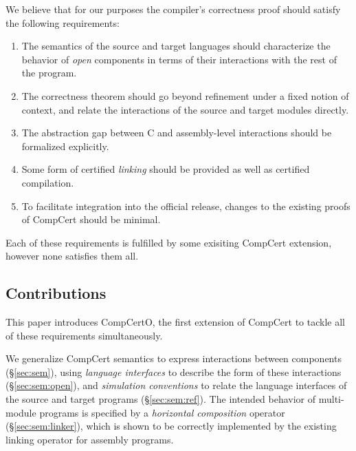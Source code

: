 \documentclass[acmsmall,authordraft]{acmart}
\begin{document}
We believe that for our purposes
the compiler's correctness proof
should satisfy the following requirements:
\begin{enumerate}
\item \label{req:opensem}
  The semantics of the source and target languages
  should characterize the behavior of \emph{open} components
  in terms of their interactions with the rest of the program.
\item \label{req:opensim}
  The correctness theorem
  should go beyond refinement under a fixed notion of context, and relate
  the interactions of the source and target modules directly.
\item \label{req:openabs}
  The abstraction gap between C and assembly-level
  interactions should be formalized explicitly.
\item \label{req:linking}
  Some form of certified \emph{linking}
  should be provided as well as certified compilation.
\item \label{req:complexity}
  To facilitate integration into the official release,
  changes to the existing proofs of CompCert
  should be minimal.
\end{enumerate}
Each of these requirements is fulfilled
by some exisiting CompCert extension,
however none satisfies them all.



\subsection{Contributions} %

This paper introduces CompCertO,
the first extension of CompCert to tackle
all of these requirements simultaneously.

We generalize CompCert semantics
to express interactions between components (\S\ref{sec:sem}),
using \emph{language interfaces}
to describe the form of these interactions (\S\ref{sec:sem:open}),
and \emph{simulation conventions}
to relate the language interfaces
of the source and target programs (\S\ref{sec:sem:ref}).
The intended behavior of
multi-module programs is specified by a
\emph{horizontal composition} operator (\S\ref{sec:sem:linker}),
which is shown to be correctly implemented
by the existing linking operator for assembly programs.
\end{document}
